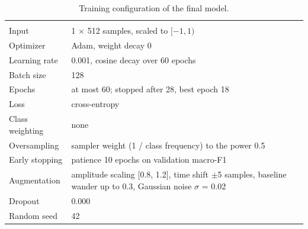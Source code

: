 \begin{table}[H]
  \centering
  \caption{Training configuration of the final model.}
  \label{tab:training-config}
  \begin{tabularx}{\linewidth}{lY}
     &  \\
    Input & 1 $\times$ 512 samples, scaled to $[-1, 1)$ \\
    Optimizer & Adam, weight decay 0 \\
    Learning rate & 0.001, cosine decay over 60 epochs \\
    Batch size & 128 \\
    Epochs & at most 60; stopped after 28, best epoch 18 \\
    Loss & cross-entropy \\
    Class weighting & none \\
    Oversampling & sampler weight (1 / class frequency) to the power 0.5 \\
    Early stopping & patience 10 epochs on validation macro-F1 \\
    Augmentation & amplitude scaling [0.8, 1.2], time shift $\pm$5 samples, baseline wander up to 0.3, Gaussian noise $\sigma$ = 0.02 \\
    Dropout & 0.000 \\
    Random seed & 42 \\
    \bottomrule
  \end{tabularx}
\end{table}
